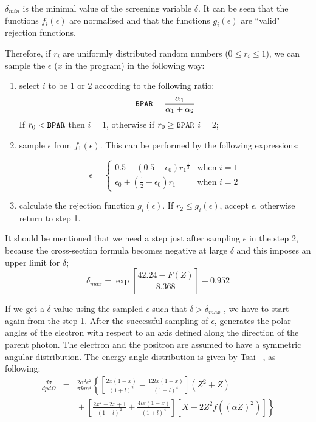 $\delta_{min}$ is the minimal value of the
screening variable $\delta$. It can be
seen that the functions $f_i(\epsilon)$ are normalised and
that the functions $ g_i(\epsilon)$ are ``valid" rejection functions.

Therefore, if $r_i$ are uniformly distributed random numbers
($0\leq r_i  \leq 1$), we can sample the
$\epsilon $ ($x$ in the program) in the following way:
\begin{enumerate}
\item
select $i$ to be 1 or 2 according to the following ratio:
\[
\mbox{\tt BPAR}  = \frac{ \alpha_1 }{\alpha_1 +\alpha_2}
\]
If $r_0 < \mbox{\tt BPAR}$ then $i=1$, otherwise if $r_0\geq \mbox{\tt BPAR}$ 
$i=2$;
\item
sample $\epsilon$  from $f_1(\epsilon)$. This can be
performed by the following expressions:

\[
\epsilon = \left\{
\begin{array}{Ll}
0.5 - (0.5 - \epsilon_0 ) {r_1}^\frac{1}{3} &
\mbox{when $i=1$} \\
\epsilon_0 + \left(\frac{1}{2} - \epsilon_0\right) r_1 &
\mbox{when $i=2$}
\end{array} \right.
\]
\item calculate the rejection function $g_i(\epsilon)$.
If $r_2\leq g_{i}(\epsilon)$, accept $ \epsilon$, otherwise return
to step 1.
\end{enumerate}

It should be mentioned that we need a step just after sampling $ \epsilon $
in the step 2, because the cross-section formula becomes
negative at large $ \delta$
and this imposes an upper limit
for $ \delta$;
\[
\delta_{max} = \exp \left[\frac{42.24-F(Z)}{8.368}\right] - 0.952
\]

If we get a $\delta$ value using the sampled $\epsilon$ such that
$\delta > \delta_{max} $ , we
have to start again from the step 1.
After the successful sampling of $\epsilon $, 
generates the polar angles
of the electron with respect to an axis defined along the direction
of the parent photon.
The electron and the positron are assumed to have
a symmetric angular distribution.
The energy-angle distribution is given by
Tsai~%
               {\cite{bib-TSAI}, \cite{bib-TSAI-err}}
as following:
\begin{eqnarray}
\frac{d \sigma}{dpd \Omega}
& = & \frac{2 \alpha^2e^2}{\pi k m^4}
      \left\{ \left[ \frac{2x(1-x)}{(1+l)^2}-\frac{12lx(1-x)}{(1+l)^4}\right]
      (Z^{2}+Z) \nonumber  \right. \\
&   & \mbox{} + \left. \left[ \frac{2x^2-2x+1}{(1+l)^2} +
      \frac{4lx(1-x)}{(1+l)^4}
      \right]
      \left[ X-2Z^{2}f((\alpha Z)^{2})\right]
      \right\} \nonumber 
\end{eqnarray}

